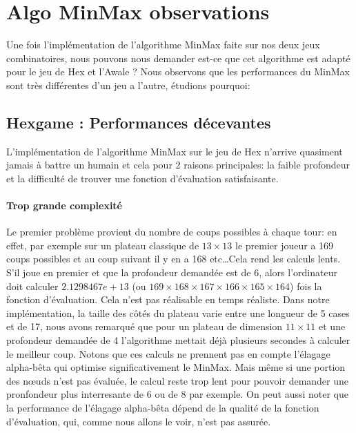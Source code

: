 




\section{Algo MinMax observations}
Une fois l'implémentation de l'algorithme MinMax faite sur nos deux
jeux combinatoires, nous pouvons nous demander est-ce que cet algorithme est adapté pour le jeu de Hex et l'Awale ?
Nous observons que les performances du MinMax sont très différentes d'un jeu a l'autre, étudions pourquoi:

\subsection{Hexgame : Performances décevantes}
L'implémentation de l'algorithme MinMax sur le jeu de Hex n'arrive quasiment jamais à battre un humain et cela pour 
2 raisons principales: la faible profondeur et la difficulté de trouver une fonction d'évaluation satisfaisante.

\paragraph{Trop grande complexité} Le premier problème provient du nombre de coups possibles à chaque tour: 
en effet, par exemple sur un plateau classique de $13\times13$ le premier joueur a 169 coups possibles et au coup suivant
il y en a 168 etc\dots Cela rend les calculs lents. S'il joue en premier 
et que la profondeur demandée est de 6, alors l'ordinateur doit calculer $2.1298467e+13$ (ou $169\times168\times167\times166\times165\times164$) 
fois la fonction d'évaluation. Cela n'est pas réalisable en temps réaliste. Dans notre implémentation, la taille des côtés du plateau varie entre  
une longueur de 5 cases et de 17, nous avons remarqué que pour un plateau de dimension $11\times11$ et une profondeur demandée de 4 l'algorithme 
mettait déjà plusieurs secondes à calculer le meilleur coup. Notons que ces calculs ne prennent pas en compte l'élagage alpha-bêta
qui optimise significativement le MinMax. Mais même si une portion des nœuds n'est pas évaluée, le calcul reste trop lent pour pouvoir demander une 
pronfondeur plus interresante de 6 ou de 8 par exemple.
On peut aussi noter que la performance de l'élagage alpha-bêta dépend de la qualité de la fonction d'évaluation, qui, comme nous allons
le voir, n'est pas assurée.

